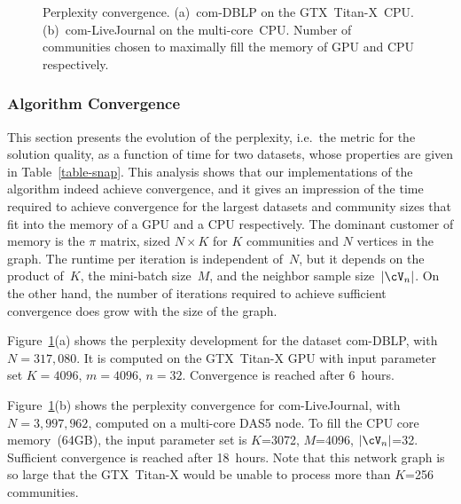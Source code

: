 
\begin{comment}
\begin{figure}[t]	%
  \centering
  \epsfig{file=plots/ppx-gpu.eps, width=\columnwidth}
  \caption{Perplexity convergence of com-DBLP on the GTX~\mbox{Titan-X}~GPU. Number
  of communities chosen to maximally fill the GPU memory.}
  \label{fig-ppx-gpu}
\end{figure}

\begin{figure}[t]	%
  \centering
  \epsfig{file=plots/ppx-cpu.eps, width=\columnwidth}
  \caption{Perplexity convergence of com-LiveJournal on the multi-core~CPU.
  Number of communities chosen to maximally fill the CPU memory.}
  \label{fig-ppx-cpu}
\end{figure}
\end{comment}

\begin{figure}[t]	%
  \centering
  \caption{Perplexity convergence. (a)~com-DBLP on the GTX~\mbox{Titan-X}~CPU.
  (b)~com-LiveJournal on the multi-core~CPU. Number of communities chosen to
  maximally fill the memory of GPU and CPU respectively.}
  \label{fig-ppx-gpu-cpu}
\end{figure}

\subsubsection{Algorithm Convergence}

This section presents the evolution of the perplexity, i.e.\ the metric for
the solution quality, as a function of time for
two datasets, whose properties are given in Table~\ref{table-snap}. This
analysis shows that our implementations of the algorithm indeed achieve
convergence, and it gives an impression of the time required to achieve
convergence for the largest datasets and community sizes that fit into the memory
of a GPU and a CPU respectively. The dominant customer of memory is the
$\pi$ matrix, sized $N{\times}K$ for $K$ communities and $N$ vertices in the
graph. The runtime per iteration is independent of~$N$, but it depends on the
product of~$K$, the mini-batch size~$M$, and the neighbor sample size~$|\Neighbors|$. On
the other hand, the number of iterations required to achieve sufficient
convergence does grow with the size of the graph.

Figure~\ref{fig-ppx-gpu-cpu}(a) shows the perplexity development for the dataset
com-DBLP, with $N=317,080$. It is computed on the GTX~\mbox{Titan-X} GPU with input
parameter set $K=4096$, $m=4096$, $n=32$. Convergence is reached after 6~hours.

Figure~\ref{fig-ppx-gpu-cpu}(b) shows the perplexity convergence for
com-LiveJournal, with $N=3,997,962$, computed on a multi-core DAS5 node.
To fill the CPU core memory~(64GB), the input parameter set is $K$=3072,
$M$=4096, $|\Neighbors|$=32. Sufficient convergence is reached after 18~hours. Note
that this network graph is so large that the GTX~\mbox{Titan-X} would be unable to
process more than $K$=256 communities.
